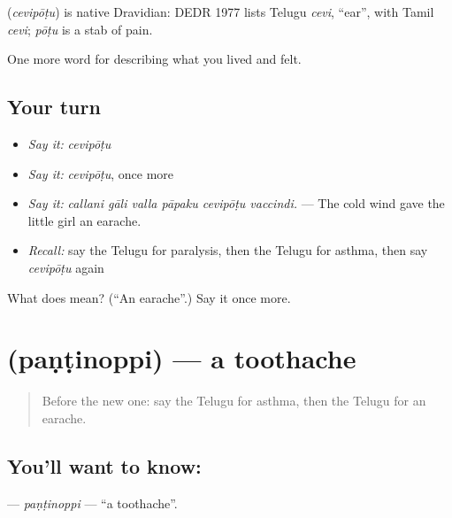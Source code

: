 \begin{cousinweb}
\textbf{} (\emph{cevipōṭu}) is native Dravidian: DEDR 1977 lists Telugu \emph{cevi}, \textquotedblleft{}ear\textquotedblright{}, with Tamil \emph{cevi}; \emph{pōṭu} is a stab of pain.
\end{cousinweb}

\begin{grammarlens}[title={What you've built}]
One more word for describing what you lived and felt.
\end{grammarlens}

\subsection*{Your turn}
\begin{itemize}
\raggedright
  \item \emph{Say it:} \emph{cevipōṭu}
  \item \emph{Say it:} \emph{cevipōṭu}, once more
  \item \emph{Say it:} \emph{callani gāli valla pāpaku cevipōṭu vaccindi.} — The cold wind gave the little girl an earache.
  \item \emph{Recall:} say the Telugu for paralysis, then the Telugu for asthma, then say \emph{cevipōṭu} again
\end{itemize}

\begin{tcolorbox}[breakable,colback=teal!4,colframe=teal!35!black,title={Before you move on}]
What does  mean? (\textquotedblleft{}An earache\textquotedblright{}.) Say it once more.
\end{tcolorbox}
\section[\texorpdfstring{\te{పంటినొప్పి} (paṇṭinoppi)}{పంటినొప్పి (paṇṭinoppi)}]{ (paṇṭinoppi) — a toothache}

\label{lesson:TE-C514-pantinoppi}



\begin{quote}
Before the new one: say the Telugu for asthma, then the Telugu for an earache.
\end{quote}

\subsection*{You'll want to know: }
\textbf{} — \emph{paṇṭinoppi} — \textquotedblleft{}a toothache\textquotedblright{}.

